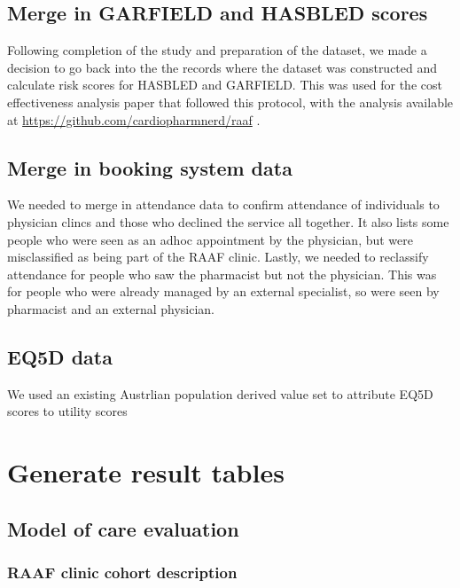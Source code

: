 \documentclass[11pt]{article}
\begin{document}
\subsection{Merge in GARFIELD and HASBLED scores}
Following completion of the study and preparation of the dataset, we made a decision to go back into the the records where the dataset was constructed and calculate risk scores for HASBLED and GARFIELD. This was used for the cost effectiveness analysis paper that followed this protocol, with the analysis available at \color{blue} \url{https://github.com/cardiopharmnerd/raaf} \color{black} . 
\color{violet}
\begin{stlog}\end{stlog}
\color{black}
\subsection{Merge in booking system data}
We needed to merge in attendance data to confirm attendance of individuals to physician clincs and those who declined the service all together. It also lists some people who were seen as an adhoc appointment by the physician, but were misclassified as being part of the RAAF clinic. Lastly, we needed to reclassify attendance for people who saw the pharmacist but not the physician. This was for people who were already managed by an external specialist, so were seen by pharmacist and an external physician. 
\color{violet}
\begin{stlog}\end{stlog}
\color{black}
\subsection{EQ5D data}
We used an existing Austrlian population derived value set to attribute EQ5D scores to utility scores \cite{eq5daus}
\color{violet}
\begin{stlog}\end{stlog}
\color{black}
\section{Generate result tables}
\subsection{Model of care evaluation}
\subsubsection{RAAF clinic cohort description}
\color{violet}
\begin{stlog}\end{stlog}
\color{black}
\end{document}
